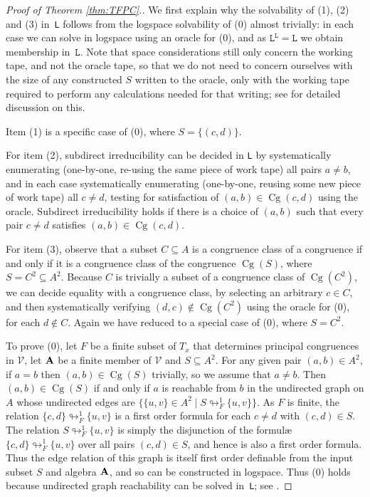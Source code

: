 \documentclass[reqno]{amsart}
\theoremstyle{plain}
\theoremstyle{definition}
\newcommand{\collapse}{\looparrowright}
\newcommand{\Cg}{\operatorname{Cg}}
\begin{document}
\begin{proof}[Proof of Theorem \ref{thm:TFPC}.]
We first explain why the solvability of (1), (2) and (3) in~\texttt{L} follows from the logspace solvability of (0) almost trivially: in each case we can solve in logspace using an oracle for (0), and as $\texttt{L}^\texttt{L}=\texttt{L}$ we obtain membership in~$\texttt{L}$.  Note that space considerations still only concern the working tape, and not the oracle tape, so that we do not need to concern ourselves with the size of any constructed $S$ written to the oracle, only with the working tape required to perform any calculations needed for that writing; see \cite[Section~6.2]{BDJN} for detailed discussion on this.

Item (1) is a specific case of (0), where $S=\{(c,d)\}$.  

For item (2), subdirect irreducibility can be decided in \texttt{L} by  systematically enumerating (one-by-one, re-using the same piece of work tape) all pairs $a\neq b$, and in each case systematically enumerating (one-by-one, reusing some new piece of work tape) all $c\neq d$, testing for satisfaction of $(a,b)\in\Cg(c,d)$ using the oracle.  Subdirect irreducibility holds if there is a choice of $(a,b)$ such that every pair $c\neq d$ satisfies $(a,b)\in\Cg(c,d)$.

For item (3), observe that a subset $C\subseteq A$ is a congruence class of a congruence if and only if it is a congruence class of the congruence $\Cg(S)$, where $S=C^2\subseteq A^2$.  
Because $C$ is trivially a subset of a congruence class of $\Cg(C^2)$, we can decide equality with a congruence class, by selecting an arbitrary $c\in C$, and then systematically verifying $(d,c)\notin \Cg(C^2)$ using the oracle for (0), for each $d\notin C$.  
Again we have reduced to a special case of (0), where $S=C^2$.

To prove (0), let $F$ be a finite subset of $T_x$ that determines principal congruences in $\mathscr{V}$, let ${\bf A}$ be a finite member of $\mathscr{V}$ and $S\subseteq A^2$.  
For any given pair $(a,b)\in A^2$, if $a=b$ then $(a,b)\in \Cg(S)$ trivially, so we assume that $a\neq b$.  Then $(a,b)\in\Cg(S)$ if and only if $a$ is reachable from $b$ in the undirected graph on $A$ whose undirected edges are $\{\{u,v\}\in A^2\mid S\collapse^1_F\{u,v\}\}$.  
As $F$ is finite, the relation $\{c,d\}\collapse^1_F\{u,v\}$ is a first order formula for each $c\neq d$ with $(c,d)\in S$.  
The relation $S\collapse^1_F\{u,v\}$ is simply the disjunction of the formul{\ae} $\{c,d\}\collapse_F^1\{u,v\}$ over all pairs $(c,d)\in S$, and hence is also a first order formula.  
Thus the edge relation of this graph is itself first order definable from the input subset $S$ and algebra ${\bf A}$, and so can be constructed in logspace.  
Thus (0) holds because undirected graph reachability can be solved in~\texttt{L}; see \cite{rei,rei2}.
\end{proof}
\end{document}
